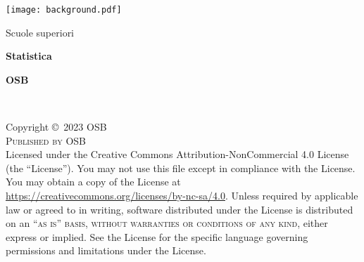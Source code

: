 \documentclass[
	11pt, %
	fleqn, %
	a4paper, %
]{LegrandOrangeBook}
\begin{document}

\titlepage %
	{\texttt{[image: background.pdf]}} %
	{ %
                \centering
		\vspace{16pt} %
		{\LARGE Scuole superiori\par} %
		\sffamily %
		{\Huge\bfseries Statistica\par} %
		\vspace{24pt} %
		{\huge\bfseries OSB\par} %
	}


\thispagestyle{empty} %

~\vfill %

\noindent Copyright \copyright\ 2023 OSB\\ %

\noindent \textsc{Published by OSB}\\ %


\noindent Licensed under the Creative Commons Attribution-NonCommercial 4.0 License (the ``License''). You may not use this file except in compliance with the License. You may obtain a copy of the License at \url{https://creativecommons.org/licenses/by-nc-sa/4.0}. Unless required by applicable law or agreed to in writing, software distributed under the License is distributed on an \textsc{``as is'' basis, without warranties or conditions of any kind}, either express or implied. See the License for the specific language governing permissions and limitations under the License.\\ %
\end{document}
